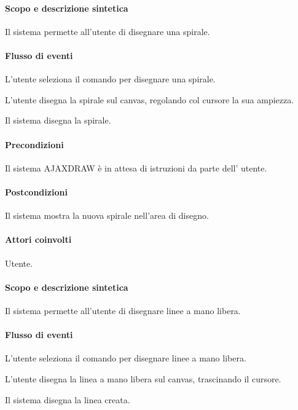 \paragraph{Scopo e descrizione sintetica} 
Il sistema permette all'utente di disegnare una spirale.
\paragraph{Flusso di eventi}
\begin{elenconumerato}[\textbf{}]{\subsubsecindent}
\item L'utente seleziona il comando per disegnare una spirale.
\item L'utente disegna la spirale sul canvas, regolando col cursore la sua ampiezza.
\item Il sistema disegna la spirale.
\end{elenconumerato}
\paragraph{Precondizioni} Il sistema AJAXDRAW \`e in attesa di istruzioni da parte dell' utente.
\paragraph{Postcondizioni} Il sistema mostra la nuova spirale nell'area di disegno.

\paragraph{Attori coinvolti} Utente.
\paragraph{Scopo e descrizione sintetica} 
Il sistema permette all'utente di disegnare linee a mano libera.
\paragraph{Flusso di eventi}
\begin{elenconumerato}[\textbf{}]{\subsubsecindent}
\item L'utente seleziona il comando per disegnare linee a mano libera.
\item L'utente disegna la linea a mano libera sul canvas, trascinando il cursore.
\item Il sistema disegna la linea creata.
\end{elenconumerato}
